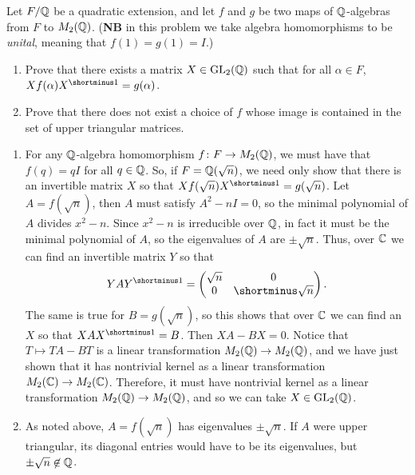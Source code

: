 \begin{question}[subtitle = {January 2021 Problem 4, edited},ID=Jan21_4]
Let $F/\mathbb{Q}$ be a quadratic extension, and let $f$ and $g$ be two maps of $\mathbb{Q}$-algebras from $F$ to $M_2(\mathbb{Q})$. (\textbf{NB} in this problem we take algebra homomorphisms to be \emph{unital}, meaning that $f(1) = g(1) = I$.)
\begin{enumerate}
    \item Prove that there exists a matrix $X \in \operatorname{GL}_2(\mathbb{Q})$ such that for all $\alpha \in F$, $X f(\alpha) X\inv = g(\alpha)$.
    \item Prove that there does not exist a choice of $f$ whose image is contained in the set of upper triangular matrices.
\end{enumerate}
\end{question}
\begin{solution}
\begin{enumerate}
    \item For any $\mathbb{Q}$-algebra homomorphism $f\colon F \to M_2(\mathbb{Q})$, we must have that $f(q) = qI$ for all $q \in \mathbb{Q}$. So, if $F = \mathbb{Q}(\sqrt{n})$, we need only show that there is an invertible matrix $X$ so that $X f(\sqrt{n}) X\inv = g(\sqrt{n})$. Let $A = f(\sqrt{n})$, then $A$ must satisfy $A^2 - nI = 0$, so the minimal polynomial of $A$ divides $x^2-n$. Since $x^2-n$ is irreducible over $\mathbb{Q}$, in fact it must be the minimal polynomial of $A$, so the eigenvalues of $A$ are $\pm \sqrt{n}$. Thus, over $\mathbb{C}$ we can find an invertible matrix $Y$ so that
    \[YAY\inv = \twomatrix{\sqrt{n}}{0}{0}{\shortminus \sqrt{n}}.\]
    The same is true for $B = g(\sqrt{n})$, so this shows that over $\mathbb{C}$ we can find an $X$ so that $XAX\inv = B$. Then $XA - BX = 0$. Notice that $T \mapsto TA - BT$ is a linear transformation $M_2(\mathbb{Q}) \to M_2(\mathbb{Q})$, and we have just shown that it has nontrivial kernel as a linear transformation $M_2(\mathbb{C}) \to M_2(\mathbb{C})$. Therefore, it must have nontrivial kernel as a linear transformation $M_2(\mathbb{Q}) \to M_2(\mathbb{Q})$, and so we can take $X \in \operatorname{GL}_2(\mathbb{Q})$.

    \item As noted above, $A = f(\sqrt{n})$ has eigenvalues $\pm \sqrt{n}$. If $A$ were upper triangular, its diagonal entries would have to be its eigenvalues, but $\pm \sqrt{n} \not\in \mathbb{Q}$. 
\end{enumerate}
\end{solution}

